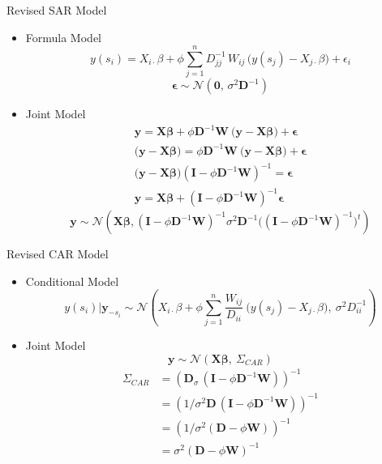 \documentclass[11pt,ignorenonframetext,]{beamer}
\providecommand{\tightlist}{%
  \setlength{\itemsep}{0pt}\setlength{\parskip}{0pt}}
\begin{document}
\begin{frame}[t]{Revised SAR Model}
\protect\hypertarget{revised-sar-model}{}

\begin{itemize}
\tightlist
\item
  Formula Model
  \[ y(s_i) = X_{i\cdot}\beta + \phi \sum_{j=1}^n D^{-1}_{jj} \, W_{ij} \, \big(y(s_j) - X_{j\cdot}\beta\big) + \epsilon_i \]
  \[ \symbf{\epsilon} \sim \mathcal{N}(\symbf{0},\, \sigma^2 \symbf{D}^{-1}) \]
\item
  Joint Model \pause \[
  \begin{aligned}
  \symbf{y} = \symbf{X}\symbf{\beta} + \phi \symbf{D}^{-1} \symbf{W} ~\big(\symbf{y}-\symbf{X}\symbf{\beta}\big) + \symbf{\epsilon} \\
  \big(\symbf{y}-\symbf{X}\symbf{\beta}\big) = \phi \symbf{D}^{-1} \symbf{W} ~\big(\symbf{y}-\symbf{X}\symbf{\beta}\big) + \symbf{\epsilon} \\
  \big(\symbf{y}-\symbf{X}\symbf{\beta}\big)(\symbf{I}-\phi\symbf{D}^{-1}\symbf{W})^{-1} = \symbf{\epsilon} \\
  \symbf{y} = \symbf{X}\symbf{\beta} + (\symbf{I} - \phi \symbf{D}^{-1} \symbf{W})^{-1} \symbf{\epsilon}
  \end{aligned}
  \] \pause \[
  \symbf{y} \sim \mathcal{N}\left(\symbf{X}\symbf{\beta}, (\symbf{I} - \phi \symbf{D}^{-1} \symbf{W})^{-1} \sigma^2 \symbf{D}^{-1} \big((\symbf{I} - \phi \symbf{D}^{-1} \symbf{W})^{-1}\big)^t \right)
  \]
\end{itemize}

\end{frame}

\begin{frame}[t]{Revised CAR Model}
\protect\hypertarget{revised-car-model}{}

\begin{itemize}
\item
  Conditional Model
  \[ y(s_i)|\symbf{y}_{-s_i} \sim \mathcal{N}\left(X_{i\cdot}\beta + \phi\sum_{j=1}^n \frac{W_{ij}}{D_{ii}} ~ \big(y(s_j)-X_{j\cdot}\beta\big),~ \sigma^2 D^{-1}_{ii} \right) \]
\item
  Joint Model \pause
  \[\symbf{y} \sim \mathcal{N}(\symbf{X}\symbf{\beta},~\Sigma_{CAR})\]
  \pause \[ \begin{aligned}
  \Sigma_{CAR}
  &= (\symbf{D}_{\sigma} \, (\symbf{I}-\phi \symbf{D}^{-1}\symbf{W}))^{-1} \\
  &= (1/\sigma^2 \symbf{D} \, (\symbf{I}-\phi \symbf{D}^{-1}\symbf{W}))^{-1} \\
  &= (1/\sigma^2 (\symbf{D}-\phi \symbf{W}))^{-1} \\
  &= \sigma^2(\symbf{D}-\phi \symbf{W})^{-1}
  \end{aligned}
  \]
\end{itemize}

\end{frame}
\end{document}

